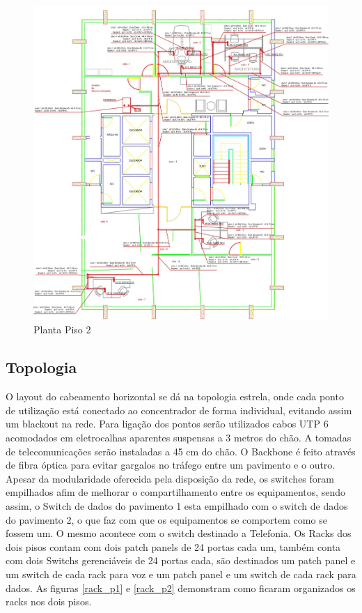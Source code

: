 \documentclass[	DIV=calc,%
							paper=a4,%
							fontsize=12pt,%
							onecolumn]{scrartcl}	 					%
\begin{document}
\begin{figure}
	\centering
	\includegraphics[width=\textwidth]{planta_p2}
	\caption{Planta Piso 2}
	\label{planta_p2}
\end{figure}
\FloatBarrier

\subsection{Topologia}
O layout do cabeamento horizontal se dá na topologia estrela, onde cada ponto de utilização está conectado ao concentrador de forma individual, evitando assim um blackout na rede. Para ligação dos pontos serão utilizados cabos UTP 6 acomodados em eletrocalhas aparentes suspensas a 3 metros do chão. A tomadas de telecomunicações serão instaladas a 45 cm do chão.
O Backbone é feito através de fibra óptica para evitar gargalos no tráfego entre um pavimento e o outro. Apesar da modularidade oferecida pela disposição da rede, os switches foram empilhados afim de melhorar o compartilhamento entre os equipamentos, sendo assim, o Switch de dados do pavimento 1 esta empilhado com o switch de dados do pavimento 2, o que faz com que os equipamentos se comportem como se fossem um. O mesmo acontece com o switch destinado a Telefonia.
Os Racks dos dois pisos contam com dois patch panels de 24 portas cada um, também conta com dois Switchs gerenciáveis de 24 portas cada, são destinados um patch panel e um switch de cada rack para voz e um patch panel e um switch de cada rack para dados.
As figuras \ref{rack_p1} e \ref{rack_p2} demonstram como ficaram organizados os racks nos dois pisos.
\end{document}
